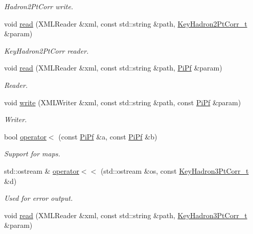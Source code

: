 \begin{DoxyCompactItemize}
\begin{DoxyCompactList}\small\item\em Hadron2\+Pt\+Corr write. \end{DoxyCompactList}\item 
void \mbox{\hyperlink{namespaceFF_ac879699f10e046e5a2059a2efcf1408b}{read}} (X\+M\+L\+Reader \&xml, const std\+::string \&path, \mbox{\hyperlink{structFF_1_1KeyHadron2PtCorr__t}{Key\+Hadron2\+Pt\+Corr\+\_\+t}} \&param)
\begin{DoxyCompactList}\small\item\em Key\+Hadron2\+Pt\+Corr reader. \end{DoxyCompactList}\item 
void \mbox{\hyperlink{namespaceFF_ab0ac23f91d1403059f1df825a7ab775f}{read}} (X\+M\+L\+Reader \&xml, const std\+::string \&path, \mbox{\hyperlink{structFF_1_1PiPf}{Pi\+Pf}} \&param)
\begin{DoxyCompactList}\small\item\em Reader. \end{DoxyCompactList}\item 
void \mbox{\hyperlink{namespaceFF_a5f456c76a7fdfa1dd9305ebda8793354}{write}} (X\+M\+L\+Writer \&xml, const std\+::string \&path, const \mbox{\hyperlink{structFF_1_1PiPf}{Pi\+Pf}} \&param)
\begin{DoxyCompactList}\small\item\em Writer. \end{DoxyCompactList}\item 
bool \mbox{\hyperlink{namespaceFF_ab2fad4623f8e931f162863b3dbff7a29}{operator$<$}} (const \mbox{\hyperlink{structFF_1_1PiPf}{Pi\+Pf}} \&a, const \mbox{\hyperlink{structFF_1_1PiPf}{Pi\+Pf}} \&b)
\begin{DoxyCompactList}\small\item\em Support for maps. \end{DoxyCompactList}\item 
std\+::ostream \& \mbox{\hyperlink{namespaceFF_aec2159c099eb8feb14ba92b783ce7493}{operator$<$$<$}} (std\+::ostream \&os, const \mbox{\hyperlink{structFF_1_1KeyHadron3PtCorr__t}{Key\+Hadron3\+Pt\+Corr\+\_\+t}} \&d)
\begin{DoxyCompactList}\small\item\em Used for error output. \end{DoxyCompactList}\item 
void \mbox{\hyperlink{namespaceFF_a457d1bd921b678eadc34fb2dbfcbdb32}{read}} (X\+M\+L\+Reader \&xml, const std\+::string \&path, \mbox{\hyperlink{structFF_1_1KeyHadron3PtCorr__t}{Key\+Hadron3\+Pt\+Corr\+\_\+t}} \&param)

\end{DoxyCompactItemize}
